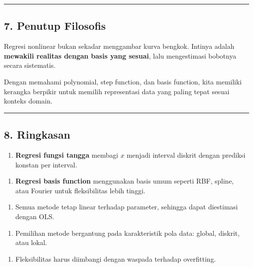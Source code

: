 \documentclass[12pt,a4paper]{article}
\begin{document}
\hrule


\subsection{7. Penutup Filosofis}

Regresi nonlinear bukan sekadar menggambar kurva bengkok. Intinya adalah \textbf{mewakili realitas dengan basis yang sesuai}, lalu mengestimasi bobotnya secara sistematis.


Dengan memahami polynomial, step function, dan basis function, kita memiliki kerangka berpikir untuk memilih representasi data yang paling tepat sesuai konteks domain.


\hrule


\subsection{8. Ringkasan}

\begin{enumerate}
\item \textbf{Regresi fungsi tangga} membagi $x$ menjadi interval diskrit dengan prediksi konstan per interval.
\end{enumerate}

\begin{enumerate}
\item \textbf{Regresi basis function} menggunakan basis umum seperti RBF, spline, atau Fourier untuk fleksibilitas lebih tinggi.
\end{enumerate}

\begin{enumerate}
\item Semua metode tetap linear terhadap parameter, sehingga dapat diestimasi dengan OLS.
\end{enumerate}

\begin{enumerate}
\item Pemilihan metode bergantung pada karakteristik pola data: global, diskrit, atau lokal.
\end{enumerate}

\begin{enumerate}
\item Fleksibilitas harus diimbangi dengan waspada terhadap overfitting.
\end{enumerate}
\end{document}
